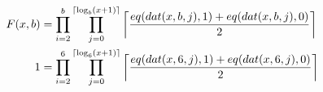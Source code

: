 \documentclass{article}
\DeclarePairedDelimiter\ceil{\lceil}{\rceil}
\begin{document}
\begin{align*}
F(x, b) &= \prod_{i=2}^{b}{\prod_{j=0}^{\ceil*{\log_b(x+1)}}{\ceil*{\frac{eq(dat(x, b, j), 1) + eq(dat(x, b, j), 0)}{2}}}}\\
1 &= \prod_{i=2}^{6}{\prod_{j=0}^{\ceil*{\log_6(x+1)}}{\ceil*{\frac{eq(dat(x, 6, j), 1) + eq(dat(x, 6, j), 0)}{2}}}}\\
\end{align*}
\end{document}
